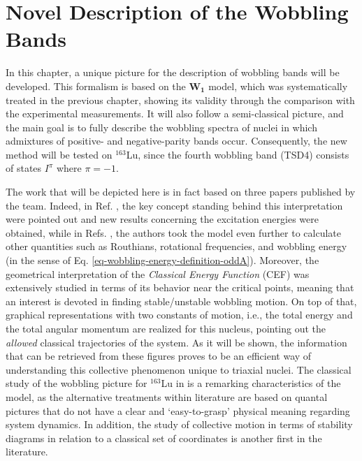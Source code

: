 \chapter{Novel Description of the Wobbling Bands}
\label{chapter-7-novel}

In this chapter, a unique picture for the description of wobbling bands will be developed. This formalism is based on the $\mathbf{W_1}$ model, which was systematically treated in the previous chapter, showing its validity through the comparison with the experimental measurements. It will also follow a semi-classical picture, and the main goal is to fully describe the wobbling spectra of nuclei in which admixtures of positive- and negative-parity bands occur. Consequently, the new method will be tested on $^{163}$Lu, since the fourth wobbling band (TSD4) consists of states $I^\pi$ where $\pi=-1$.

The work that will be depicted here is in fact based on three papers published by the team. Indeed, in Ref. \cite{poenaru2021parity}, the key concept standing behind this interpretation were pointed out and new results concerning the excitation energies were obtained, while in Refs. \cite{poenaru2021extensive1,poenaru2021extensive2}, the authors took the model even further to calculate other quantities such as Routhians, rotational frequencies, and wobbling energy (in the sense of Eq. \ref{eq-wobbling-energy-definition-oddA}). Moreover, the geometrical interpretation of the \emph{Classical Energy Function} (CEF) was extensively studied in terms of its behavior near the critical points, meaning that an interest is devoted in finding stable/unstable wobbling motion. On top of that, graphical representations with two constants of motion, i.e., the total energy and the total angular momentum are realized for this nucleus, pointing out the \emph{allowed} classical trajectories of the system. As it will be shown, the information that can be retrieved from these figures proves to be an efficient way of understanding this collective phenomenon unique to triaxial nuclei. The classical study of the wobbling picture for $^{163}$Lu in \cite{poenaru2021extensive2} is a remarking characteristics of the model, as the alternative treatments within literature are based on quantal pictures that do not have a clear and `easy-to-grasp' physical meaning regarding system dynamics. In addition, the study of collective motion in terms of stability diagrams in relation to a classical set of coordinates is another first in the literature.

